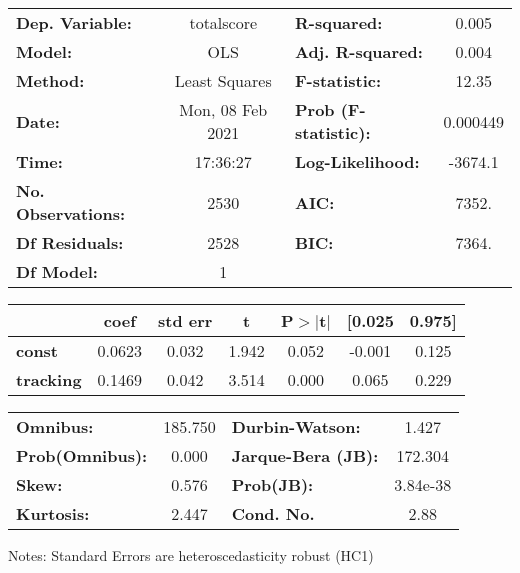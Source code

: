 \begin{center}
\begin{tabular}{lclc}
\toprule
\textbf{Dep. Variable:}    &    totalscore    & \textbf{  R-squared:         } &     0.005   \\
\textbf{Model:}            &       OLS        & \textbf{  Adj. R-squared:    } &     0.004   \\
\textbf{Method:}           &  Least Squares   & \textbf{  F-statistic:       } &     12.35   \\
\textbf{Date:}             & Mon, 08 Feb 2021 & \textbf{  Prob (F-statistic):} &  0.000449   \\
\textbf{Time:}             &     17:36:27     & \textbf{  Log-Likelihood:    } &   -3674.1   \\
\textbf{No. Observations:} &        2530      & \textbf{  AIC:               } &     7352.   \\
\textbf{Df Residuals:}     &        2528      & \textbf{  BIC:               } &     7364.   \\
\textbf{Df Model:}         &           1      & \textbf{                     } &             \\
\bottomrule
\end{tabular}
\begin{tabular}{lcccccc}
                  & \textbf{coef} & \textbf{std err} & \textbf{t} & \textbf{P$> |$t$|$} & \textbf{[0.025} & \textbf{0.975]}  \\
\midrule
\textbf{const}    &       0.0623  &        0.032     &     1.942  &         0.052        &       -0.001    &        0.125     \\
\textbf{tracking} &       0.1469  &        0.042     &     3.514  &         0.000        &        0.065    &        0.229     \\
\bottomrule
\end{tabular}
\begin{tabular}{lclc}
\textbf{Omnibus:}       & 185.750 & \textbf{  Durbin-Watson:     } &    1.427  \\
\textbf{Prob(Omnibus):} &   0.000 & \textbf{  Jarque-Bera (JB):  } &  172.304  \\
\textbf{Skew:}          &   0.576 & \textbf{  Prob(JB):          } & 3.84e-38  \\
\textbf{Kurtosis:}      &   2.447 & \textbf{  Cond. No.          } &     2.88  \\
\bottomrule
\end{tabular}
\end{center}

Notes: \newline
 [1] Standard Errors are heteroscedasticity robust (HC1)
